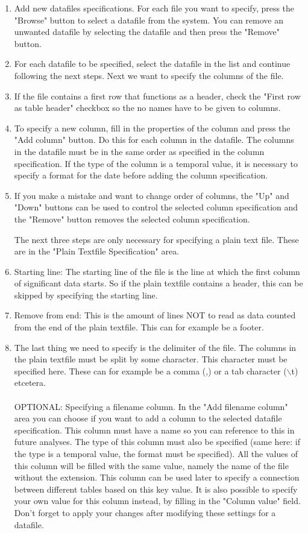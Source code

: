 \documentclass[a4paper]{article}
\begin{document}
\begin{enumerate}
\item Add new datafiles specifications. For each file you want to specify, press the "Browse" button to select a datafile from the system. You can remove an unwanted datafile by selecting the datafile and then press the "Remove" button.
\item For each datafile to be specified, select the datafile in the list and continue following the next steps.
Next we want to specify the columns of the file. 
\item If the file contains a first row that functions as a header, check the "First row as table header" checkbox so the no names have to be given to columns. 
\item To specify a new column, fill in the properties of the column and press the "Add column" button. Do this for each column in the datafile. The columns in the datafile must be in the same order as specified in the column specification. If the type of the column is a temporal value, it is necessary to specify a format for the date before adding the column specification.
\item If you make a mistake and want to change order of columns, the "Up" and "Down" buttons can be used to control the selected column specification and the "Remove" button removes the selected column specification.

The next three steps are only necessary for specifying a plain text file. These are in the "Plain Textfile Specification" area.
\item Starting line: The starting line of the file is the line at which the first column of significant data starts. So if the plain textfile contains a header, this can be skipped by specifying the starting line.
\item Remove from end: This is the amount of lines NOT to read as data counted from the end of the plain textfile. This can for example be a footer.
\item The last thing we need to specify is the delimiter of the file. The columns in the plain textfile must be split by some character. This character must be specified here. These can for example be a comma (,) or a tab character ($\backslash$t) etcetera.
\\\\

OPTIONAL: Specifying a filename column. In the "Add filename column" area you can choose if you want to add a column to the selected datafile specification. This column must have a name so you can reference to this in future analyses. The type of this column must also be specified (same here: if the type is a temporal value, the format must be specified). All the values of this column will be filled with the same value, namely the name of the file without the extension. This column can be used later to specify a connection between different tables based on this key value. It is also possible to specify your own value for this column instead, by filling in the "Column value" field. Don't forget to apply your changes after modifying these settings for a datafile.
\\\\


\end{enumerate}
\end{document}
